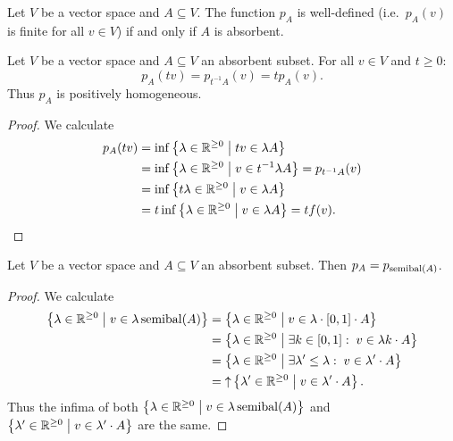 \begin{lemma} \label{gaugeWellDefined}
Let $V$ be a vector space and $A\subseteq V$. The function $p_A$ is well-defined (i.e.\ $p_A(v)$ is finite for all $v\in V$) \textup{if and only if} $A$ is absorbent.
\end{lemma}

\begin{lemma} \label{gaugeScaling}
Let $V$ be a vector space and $A\subseteq V$ an absorbent subset. For all $v\in V$ and $t\geq 0$:
\[ p_A(tv) = p_{t^{-1}A}(v) = t p_A(v). \]
Thus $p_A$ is positively homogeneous.
\end{lemma}
\begin{proof}
We calculate
\begin{align*}
p_A(tv) &= \inf\left\{ \lambda\in \mathbb{R}^{\geq 0} \;\middle|\; tv\in \lambda A \right\} \\
&= \inf\left\{ \lambda\in \mathbb{R}^{\geq 0} \;\middle|\; v\in t^{-1}\lambda A \right\} = p_{t^{-1}A}(v) \\
&= \inf\left\{ t\lambda\in \mathbb{R}^{\geq 0} \;\middle|\; v\in \lambda A \right\} \\
&= t\inf\left\{ \lambda\in \mathbb{R}^{\geq 0} \;\middle|\; v\in \lambda A \right\} = tf(v).
\end{align*}
\end{proof}

\begin{lemma} \label{semibalancedClosureGauge}
Let $V$ be a vector space and $A\subseteq V$ an absorbent subset. Then $p_A = p_{\operatorname{semibal}(A)}$.
\end{lemma}
\begin{proof}
We calculate
\begin{align*}
\setbuilder{\lambda\in\R^{\geq 0}}{v\in \lambda \semibalanced(A)} &= \setbuilder{\lambda\in\R^{\geq 0}}{v\in \lambda\cdot\interval{0,1}\cdot A} \\
&= \setbuilder{\lambda\in\R^{\geq 0}}{\exists k\in \interval{0,1}:\; v\in \lambda k\cdot A} \\
&= \setbuilder{\lambda\in\R^{\geq 0}}{\exists \lambda'\leq \lambda:\; v\in \lambda' \cdot A} \\
&= \upset \setbuilder{\lambda'\in\R^{\geq 0}}{v\in \lambda' \cdot A}.
\end{align*}
Thus the infima of both $\left\{ \lambda\in\mathbb{R}^{\geq 0} \;\middle|\; v\in \lambda \operatorname{semibal}(A) \right\}$ and $\left\{ \lambda'\in\mathbb{R}^{\geq 0} \;\middle|\; v\in \lambda' \cdot A \right\}$ are the same.
\end{proof}

